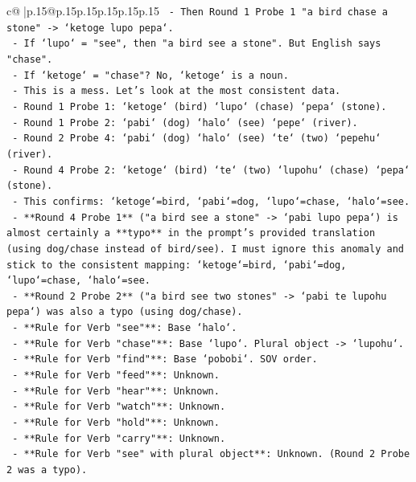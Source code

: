 \documentclass{article}
\begin{document}
{\begin{supertabular}{c@{$\;$}|p{.15\linewidth}@{}p{.15\linewidth}p{.15\linewidth}p{.15\linewidth}p{.15\linewidth}p{.15\linewidth}}
{{{\texttt{    {-} Then Round 1 Probe 1 "a bird chase a stone" {-}> `ketoge lupo pepa`.} \\
\texttt{      {-} If `lupo` = "see", then "a bird see a stone". But English says "chase".} \\
\texttt{      {-} If `ketoge` = "chase"? No, `ketoge` is a noun.} \\
\texttt{    {-} This is a mess. Let's look at the most consistent data.} \\
\texttt{    {-} Round 1 Probe 1: `ketoge` (bird) `lupo` (chase) `pepa` (stone).} \\
\texttt{    {-} Round 1 Probe 2: `pabi` (dog) `halo` (see) `pepe` (river).} \\
\texttt{    {-} Round 2 Probe 4: `pabi` (dog) `halo` (see) `te` (two) `pepehu` (river).} \\
\texttt{    {-} Round 4 Probe 2: `ketoge` (bird) `te` (two) `lupohu` (chase) `pepa` (stone).} \\
\texttt{    {-} This confirms: `ketoge`=bird, `pabi`=dog, `lupo`=chase, `halo`=see.} \\
\texttt{    {-} **Round 4 Probe 1** ("a bird see a stone" {-}> `pabi lupo pepa`) is almost certainly a **typo** in the prompt's provided translation (using dog/chase instead of bird/see). I must ignore this anomaly and stick to the consistent mapping: `ketoge`=bird, `pabi`=dog, `lupo`=chase, `halo`=see.} \\
\texttt{    {-} **Round 2 Probe 2** ("a bird see two stones" {-}> `pabi te lupohu pepa`) was also a typo (using dog/chase).} \\
\texttt{    {-} **Rule for Verb "see"**: Base `halo`.} \\
\texttt{    {-} **Rule for Verb "chase"**: Base `lupo`. Plural object {-}> `lupohu`.} \\
\texttt{    {-} **Rule for Verb "find"**: Base `pobobi`. SOV order.} \\
\texttt{    {-} **Rule for Verb "feed"**: Unknown.} \\
\texttt{    {-} **Rule for Verb "hear"**: Unknown.} \\
\texttt{    {-} **Rule for Verb "watch"**: Unknown.} \\
\texttt{    {-} **Rule for Verb "hold"**: Unknown.} \\
\texttt{    {-} **Rule for Verb "carry"**: Unknown.} \\
\texttt{    {-} **Rule for Verb "see" with plural object**: Unknown. (Round 2 Probe 2 was a typo).} \\
}}}
\end{supertabular}}
\end{document}
